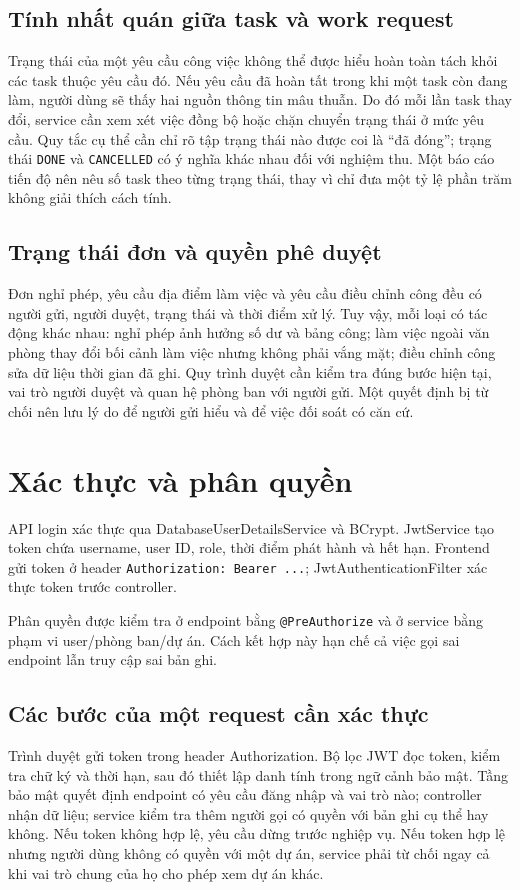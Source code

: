 \documentclass[12pt,a4paper,oneside]{report}
\newcommand{\code}[1]{\texttt{#1}}
\begin{document}
\subsection{Tính nhất quán giữa task và work request}
Trạng thái của một yêu cầu công việc không thể được hiểu hoàn toàn tách khỏi các task thuộc yêu cầu đó. Nếu yêu cầu đã hoàn tất trong khi một task còn đang làm, người dùng sẽ thấy hai nguồn thông tin mâu thuẫn. Do đó mỗi lần task thay đổi, service cần xem xét việc đồng bộ hoặc chặn chuyển trạng thái ở mức yêu cầu. Quy tắc cụ thể cần chỉ rõ tập trạng thái nào được coi là ``đã đóng''; trạng thái \code{DONE} và \code{CANCELLED} có ý nghĩa khác nhau đối với nghiệm thu. Một báo cáo tiến độ nên nêu số task theo từng trạng thái, thay vì chỉ đưa một tỷ lệ phần trăm không giải thích cách tính.

\subsection{Trạng thái đơn và quyền phê duyệt}
Đơn nghỉ phép, yêu cầu địa điểm làm việc và yêu cầu điều chỉnh công đều có người gửi, người duyệt, trạng thái và thời điểm xử lý. Tuy vậy, mỗi loại có tác động khác nhau: nghỉ phép ảnh hưởng số dư và bảng công; làm việc ngoài văn phòng thay đổi bối cảnh làm việc nhưng không phải vắng mặt; điều chỉnh công sửa dữ liệu thời gian đã ghi. Quy trình duyệt cần kiểm tra đúng bước hiện tại, vai trò người duyệt và quan hệ phòng ban với người gửi. Một quyết định bị từ chối nên lưu lý do để người gửi hiểu và để việc đối soát có căn cứ.

\section{Xác thực và phân quyền}
API login xác thực qua DatabaseUserDetailsService và BCrypt. JwtService tạo token chứa username, user ID, role, thời điểm phát hành và hết hạn. Frontend gửi token ở header \code{Authorization: Bearer ...}; JwtAuthenticationFilter xác thực token trước controller.

Phân quyền được kiểm tra ở endpoint bằng \code{@PreAuthorize} và ở service bằng phạm vi user/phòng ban/dự án. Cách kết hợp này hạn chế cả việc gọi sai endpoint lẫn truy cập sai bản ghi.

\subsection{Các bước của một request cần xác thực}
Trình duyệt gửi token trong header Authorization. Bộ lọc JWT đọc token, kiểm tra chữ ký và thời hạn, sau đó thiết lập danh tính trong ngữ cảnh bảo mật. Tầng bảo mật quyết định endpoint có yêu cầu đăng nhập và vai trò nào; controller nhận dữ liệu; service kiểm tra thêm người gọi có quyền với bản ghi cụ thể hay không. Nếu token không hợp lệ, yêu cầu dừng trước nghiệp vụ. Nếu token hợp lệ nhưng người dùng không có quyền với một dự án, service phải từ chối ngay cả khi vai trò chung của họ cho phép xem dự án khác.
\end{document}
